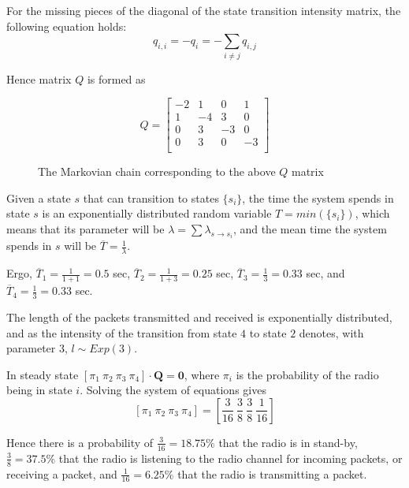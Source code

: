 For the missing pieces of the diagonal of the state transition intensity matrix,
the following equation holds:
$$q_{i,i} = -q_i = -\sum_{i \neq j} q_{i,j}$$

Hence matrix $Q$ is formed as

\begin{equation*}
  Q =
  \begin{bmatrix}
    -2  & 1   & 0   & 1   \\
    1   & -4  & 3   & 0   \\
    0   & 3   & -3  & 0   \\
    0   & 3   & 0   & -3  \\
  \end{bmatrix}
\end{equation*}

\begin{figure}[H]
	\centering
	\scalebox{1}{}
	\caption{The Markovian chain corresponding to the above $Q$ matrix}
\end{figure}

Given a state $s$ that can transition to states $\{s_i\}$, the time the
system spends in state $s$ is an exponentially distributed random variable
$T = min(\{s_i\})$, which means that its parameter will be
$\lambda = \sum \lambda_{s \rightarrow s_i}$, and the mean time the system
spends in $s$ will be $\overline{T} = \frac{1}{\lambda}$.

Ergo, $\overline{T}_1 = \frac{1}{1+1} = 0.5$ sec,
$\overline{T}_2 = \frac{1}{1+3} = 0.25$ sec,
$\overline{T}_3 = \frac{1}{3} = 0.33$ sec, and
$\overline{T}_4 = \frac{1}{3} = 0.33$ sec.

The length of the packets transmitted and received is exponentially
distributed, and as the intensity of the transition from state $4$ to state $2$
denotes, with parameter $3$, $l \sim Exp(3)$.


In steady state $[\pi_1\ \pi_2\ \pi_3\ \pi_4] \cdot \mathbf{Q} = \mathbf{0}$,
where $\pi_i$ is the probability of the radio being in state $i$. Solving the
system of equations gives
$$[\pi_1\ \pi_2\ \pi_3\ \pi_4] = [\frac{3}{16}\ \frac{3}{8}\ \frac{3}{8}\ \frac{1}{16}]$$

Hence there is a probability of $\frac{3}{16}=18.75\%$ that the radio is in
stand-by, $\frac{3}{8}=37.5\%$ that the radio is listening to the radio channel
for incoming packets, or receiving a packet, and $\frac{1}{16} = 6.25\%$ that
the radio is transmitting a packet.
